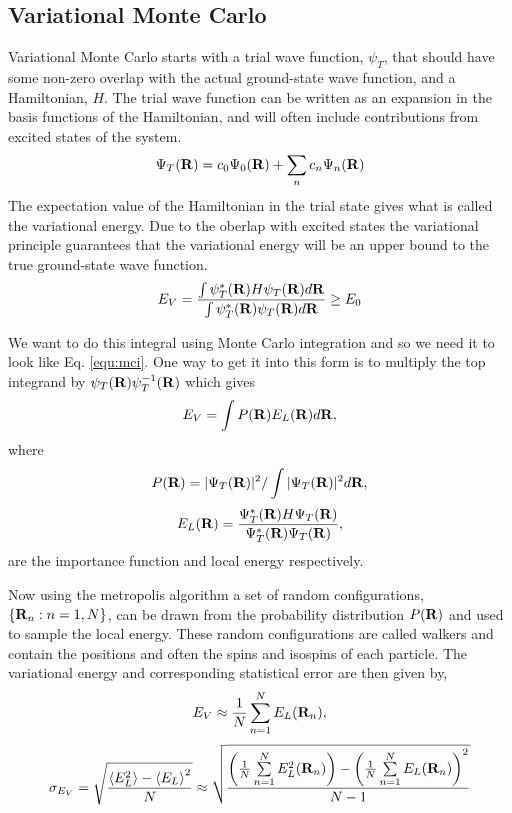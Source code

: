 \subsection{Variational Monte Carlo}
Variational Monte Carlo starts with a trial wave function, $\psi_T$, that should have some non-zero overlap with the actual ground-state wave function, and a Hamiltonian, $H$. The trial wave function can be written as an expansion in the basis functions of the Hamiltonian, and will often include contributions from excited states of the system.
\begin{equation}
   \Psi_T(\mathbf{R}) = c_0\Psi_0(\mathbf{R}) + \sum\limits_n c_n \Psi_n(\mathbf{R})
\end{equation}
The expectation value of the Hamiltonian in the trial state gives what is called the variational energy. Due to the oberlap with excited states the variational principle guarantees that the variational energy will be an upper bound to the true ground-state wave function.
\begin{equation}
   E_V = \frac{\int\psi_T^*(\mathbf{R})H\psi_T(\mathbf{R})d\mathbf{R}}{\int\psi_T^*(\mathbf{R})\psi_T(\mathbf{R})d\mathbf{R}} \ge E_0
\end{equation}

We want to do this integral using Monte Carlo integration and so we need it to look like Eq. \ref{equ:mci}. One way to get it into this form is to multiply the top integrand by $\psi_T(\mathbf{R})\psi_T^{-1}(\mathbf{R})$ which gives
\begin{equation} 
  E_V = \int P(\mathbf{R}) E_L(\mathbf{R}) d\mathbf{R},
\end{equation}
where
\begin{equation}
   P(\mathbf{R}) = |\Psi_T(\mathbf{R})|^2/\int|\Psi_T(\mathbf{R})|^2d\mathbf{R},
\end{equation}
\begin{equation}
   E_L(\R) = \frac{\Psi_T^*(\R)H\Psi_T(\R)}{\Psi_T^*(\R)\Psi_T(\R)},%
\end{equation}
are the importance function and local energy respectively.

Now using the metropolis algorithm a set of random configurations, $\{\mathbf{R}_n: n=1,N\}$, can be drawn from the probability distribution $P(\mathbf{R})$ and used to sample the local energy. These random configurations are called walkers and contain the positions and often the spins and isospins of each particle. The variational energy and corresponding statistical error are then given by,
\begin{equation} 
  E_V \approx \frac{1}{N} \sum\limits_{n=1}^N E_L({\mathbf{R}_n}),
\end{equation}
\begin{equation} 
  \sigma_{E_V} = \sqrt{\frac{\left<E_L^2\right>-\left<E_L\right>^2}{N}} \approx \sqrt{\frac{\left(\frac{1}{N}\sum\limits_{n=1}^NE_L^2(\mathbf{R}_n)\right) - \left(\frac{1}{N}\sum\limits_{n=1}^NE_L(\mathbf{R}_n)\right)^2}{N-1}}
\end{equation}

